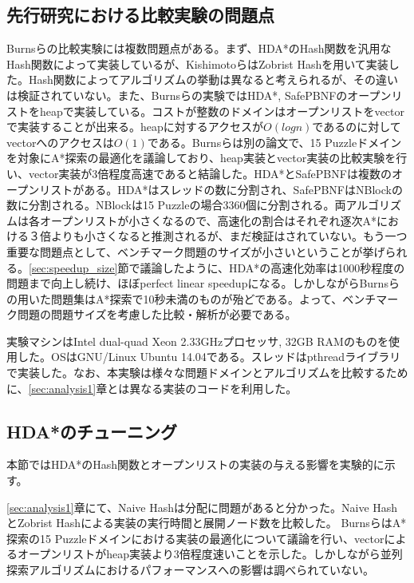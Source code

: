 \documentclass[uplatex]{jsarticle}
\begin{document}
\subsection{先行研究における比較実験の問題点}

Burnsらの比較実験には複数問題点がある\cite{Burns2010}。まず、HDA*のHash関数を汎用なHash関数によって実装しているが、KishimotoらはZobrist Hashを用いて実装した。Hash関数によってアルゴリズムの挙動は異なると考えられるが、その違いは検証されていない。また、Burnsらの実験ではHDA*, SafePBNFのオープンリストをheapで実装している。コストが整数のドメインはオープンリストをvectorで実装することが出来る。heapに対するアクセスが$O(logn)$であるのに対してvectorへのアクセスは$O(1)$である。Burnsらは別の論文で、15 Puzzleドメインを対象にA*探索の最適化を議論しており、heap実装とvector実装の比較実験を行い、vector実装が3倍程度高速であると結論した\cite{Burns2012implementing}。HDA*とSafePBNFは複数のオープンリストがある。HDA*はスレッドの数に分割され、SafePBNFはNBlockの数に分割される。NBlockは15 Puzzleの場合3360個に分割される。両アルゴリズムは各オープンリストが小さくなるので、高速化の割合はそれぞれ逐次A*における３倍よりも小さくなると推測されるが、まだ検証はされていない。もう一つ重要な問題点として、ベンチマーク問題のサイズが小さいということが挙げられる。\ref{sec:speedup_size}節で議論したように、HDA*の高速化効率は1000秒程度の問題まで向上し続け、ほぼperfect linear speedupになる。しかしながらBurnsらの用いた問題集はA*探索で10秒未満のものが殆どである。よって、ベンチマーク問題の問題サイズを考慮した比較・解析が必要である。
\newline

実験マシンはIntel dual-quad Xeon 2.33GHzプロセッサ, 32GB RAMのものを使用した。OSはGNU/Linux Ubuntu 14.04である。スレッドはpthreadライブラリで実装した。なお、本実験は様々な問題ドメインとアルゴリズムを比較するために、\ref{sec:analysis1}章とは異なる実装のコードを利用した。

\subsection{HDA*のチューニング}
\label{sec:hdastar_tuning}

本節ではHDA*のHash関数とオープンリストの実装の与える影響を実験的に示す。

\ref{sec:analysis1}章にて、Naive Hashは分配に問題があると分かった。Naive HashとZobrist Hashによる実装の実行時間と展開ノード数を比較した。
BurnsらはA*探索の15 Puzzleドメインにおける実装の最適化について議論を行い、vectorによるオープンリストがheap実装より3倍程度速いことを示した\cite{Burns2012implementing}。しかしながら並列探索アルゴリズムにおけるパフォーマンスへの影響は調べられていない。
\end{document}
